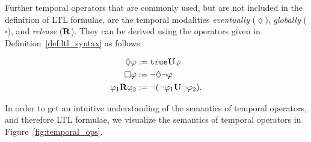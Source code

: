 \documentclass[a4paper, 12pt, twoside]{report}
\theoremstyle{plain}
\begin{document}
	Further temporal operators that are commonly used, but are not included in the definition of LTL formulae, are the temporal modalities \textit{eventually}  ($\lozenge$), \textit{globally} ($\square$), and \textit{release} ($\textbf{\textup{R}}$). They can be derived using the operators given in Definition~\ref{def:ltl_syntax} as follows: 
	
	\begin{align*}		
		\lozenge \varphi &:= \texttt{\textup{true}} \textbf{\textup{U}} \varphi\\
		\square \varphi &:= \neg \lozenge\neg\varphi\\
		\varphi_1 \textbf{\textup{R}} \varphi_2 &:= \neg(\neg\varphi_1 \textbf{\textup{U}} \neg \varphi_2).
	\end{align*}
	
	In order to get an intuitive understanding of the semantics of temporal operators, and therefore LTL formulae, we visualize the semantics of temporal operators in Figure~\ref{fig:temporal_ops}.
	
\end{document}
